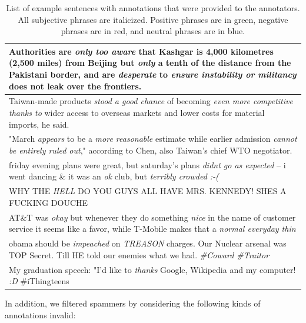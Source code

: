  \begin{table}[t]
 \centering
\small
\begin{tabular}{|p{16cm}|}
\hline
 Authorities are \textit{\color{red}only too aware} that Kashgar is 4,000 kilometres (2,500 miles) from Beijing but \textit{only} a tenth of the distance from the  Pakistani border, and are \textit{\color{red}desperate} to \textit{\color{red} ensure instability or militancy} does not leak over the frontiers. \\
 \hline
Taiwan-made products \textit{\color{green} stood a good chance} of becoming \textit{\color{green} even more competitive thanks to} wider access to overseas markets and lower costs for material imports, he said. \\
\hline
"March \textit{\color{blue}appears} to be a \textit{\color{blue}more reasonable} estimate while earlier admission \textit{\color{blue}cannot be entirely ruled out}," according to Chen, also Taiwan's chief WTO negotiator. \\
\hline
friday evening plans were great, but saturday's plans \textit{\color{red}didnt go as expected} -- i went dancing \& it was an \textit{\color{blue}ok} club, but \textit{\color{red}terribly crowded :-(} \\
\hline
WHY THE \textit{\color{red}HELL} DO YOU GUYS ALL HAVE MRS. KENNEDY! SHES A FUCKING DOUCHE \\
\hline
AT\&T was \textit{\color{blue}okay} but whenever they do something \textit{\color{green}nice} in the name of customer service it seems like a favor, while T-Mobile makes that a \textit{\color{green}normal everyday thin} \\
\hline
obama should be \textit{\color{red}impeached} on \textit{\color{red}TREASON} charges. Our Nuclear arsenal was TOP Secret. Till HE told our enemies what we had. \textit{\color{red}\#Coward \#Traitor} \\
\hline
My graduation speech: "I'd like to \textit{\color{green}thanks} Google, Wikipedia and my computer! \textit{\color{green}:D} \#iThingteens \\
\hline
\end{tabular}
\caption{List of example sentences with annotations that were provided to the annotators. All subjective phrases are italicized. Positive phrases are in green, negative phrases are in red, and neutral phrases are in blue.}
\label{T:annotation-examples}
\end{table}

In addition, we filtered spammers by considering the following kinds of annotations invalid:

